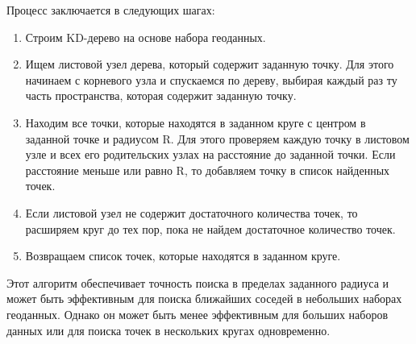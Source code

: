 Процесс заключается в следующих шагах:

\begin{enumerate}
    \item Строим KD-дерево на основе набора геоданных.
    \item Ищем листовой узел дерева, который содержит заданную точку. Для этого начинаем с корневого узла и спускаемся по дереву, выбирая каждый раз ту часть пространства, которая содержит заданную точку.
    \item Находим все точки, которые находятся в заданном круге с центром в заданной точке и радиусом R. Для этого проверяем каждую точку в листовом узле и всех его родительских узлах на расстояние до заданной точки. Если расстояние меньше или равно R, то добавляем точку в список найденных точек.
    \item Если листовой узел не содержит достаточного количества точек, то расширяем круг до тех пор, пока не найдем достаточное количество точек.
    \item Возвращаем список точек, которые находятся в заданном круге.
\end{enumerate}

Этот алгоритм обеспечивает точность поиска в пределах заданного радиуса и может быть эффективным для поиска ближайших соседей в небольших наборах геоданных. Однако он может быть менее эффективным для больших наборов данных или для поиска точек в нескольких кругах одновременно.

